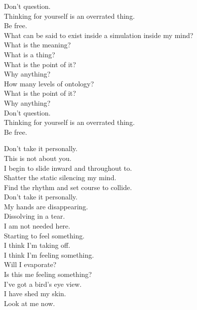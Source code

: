 Don't question. \\
Thinking for yourself is an overrated thing. \\
Be free. \\

What can be said to exist inside a simulation inside my mind? \\

What is the meaning? \\
What is a thing? \\
What is the point of it? \\
Why anything? \\
How many levels of ontology? \\
What is the point of it? \\
Why anything? \\

Don't question. \\
Thinking for yourself is an overrated thing. \\
Be free. \\





Don't take it personally. \\
This is not about you. \\
I begin to slide inward and throughout to. \\
Shatter the static silencing my mind. \\
Find the rhythm and set course to collide. \\

Don't take it personally. \\
My hands are disappearing. \\
Dissolving in a tear. \\
I am not needed here. \\

Starting to feel something. \\
I think I'm taking off. \\
I think I'm feeling something. \\
Will I evaporate? \\
Is this me feeling something? \\
I've got a bird's eye view. \\
I have shed my skin. \\
Look at me now. \\

